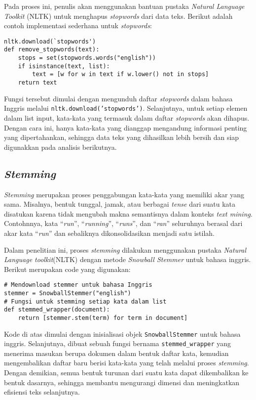 \documentclass[a4paper,12pt]{report}
\numberwithin{equation}{chapter}
\begin{document}
Pada proses ini, penulis akan menggunakan bantuan pustaka \textit{Natural Language Toolkit} (NLTK) untuk menghapus \textit{stopwords} dari data teks. Berikut adalah contoh implementasi sederhana untuk \textit{stopwords}:

\begin{verbatim}
nltk.download(`stopwords')
def remove_stopwords(text): 
    stops = set(stopwords.words("english"))
    if isinstance(text, list):
        text = [w for w in text if w.lower() not in stops]
    return text
\end{verbatim}

Fungsi tersebut dimulai dengan mengunduh daftar \textit{stopwords} dalam bahasa Inggris melalui \texttt{nltk.download('stopwords')}. Selanjutnya, untuk setiap elemen dalam list input, kata-kata yang termasuk dalam daftar \textit{stopwords} akan dihapus. Dengan cara ini, hanya kata-kata yang dianggap mengandung informasi penting yang dipertahankan, sehingga data teks yang dihasilkan lebih bersih dan siap digunakkan pada analisis berikutnya.

\subsection{\textit{Stemming}}
\textit{Stemming} merupakan proses penggabungan kata-kata yang memiliki akar yang sama. Misalnya, bentuk tunggal, jamak, atau berbagai \textit{tense} dari suatu kata disatukan karena tidak mengubah makna semantisnya dalam konteks \textit{text mining}. Contohnnya, kata ``\textit{run}'', ``\textit{running}'', ``\textit{runs}'', dan ``\textit{ran}'' seluruhnya berasal dari akar kata ``\textit{run}'' dan sebaliknya dikonsolidasikan menjadi satu istilah.

Dalam penelitian ini, proses \textit{stemming} dilakukan menggunakan pustaka \textit{Natural Language toolkit}(NLTK) dengan metode \textit{Snowball Stemmer} untuk bahasa inggris. Berikut merupakan code yang digunakan:

\begin{verbatim}
# Mendownload stemmer untuk bahasa Inggris
stemmer = SnowballStemmer("english")
# Fungsi untuk stemming setiap kata dalam list
def stemmed_wrapper(document): 
    return [stemmer.stem(term) for term in document]
\end{verbatim}

Kode di atas dimulai dengan inisialisasi objek \texttt{SnowballStemmer} untuk bahasa inggris. Selanjutnya, dibuat sebuah fungsi bernama \texttt{stemmed\_wrapper} yang menerima masukan berupa dokumen dalam bentuk daftar kata, kemudian mengembalikan daftar baru berisi kata-kata yang telah melalui proses \textit{stemming}. Dengan demikian, semua bentuk turunan dari suatu kata dapat dikembalikan ke bentuk dasarnya, sehingga membantu mengurangi dimensi dan meningkatkan efisiensi teks selanjutnya.
\end{document}
